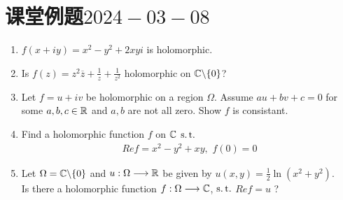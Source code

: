 \section{课堂例题$2024-03-08$}
	\begin{enumerate}
		\item $f(x + i y) = x^2 - y^2 + 2xy i$ is holomorphic.
		
		\vspace{2em}
		
		\item Is $f(z) = z^2 \overline{z} + \frac{1}{z} + \frac{1}{z^2}$ holomorphic on $\mathbb{C} \backslash \{ 0 \}$?
		
		\vspace{2em}
		
		\item Let $f = u + i v$ be holomorphic on a region $\Omega$. Assume $au + bv + c = 0$ for some $a , b , c \in \mathbb{R}$ and $a , b$ are not all zero. Show $f$ is consistant.
		
		\vspace{2em}
		
		\item Find a holomorphic function $f$ on $\mathbb{C}$ $\operatorname{s.t.}$
		\begin{align}
			Re f = x^2 - y^2 + xy , \,\, f(0) = 0
		\end{align}
	
		\vspace{2em}
		
		\item Let $\Omega = \mathbb{C} \backslash \{ 0 \}$ and $u : \Omega \longrightarrow \mathbb{R}$ be given by $u(x , y) = \frac{1}{2} \ln(x^2 + y^2)$.\\
		Is there a holomorphic function $f : \Omega \longrightarrow \mathbb{C}$, $\operatorname{s.t.}$ $Ref = u$ ?
		

\end{enumerate}
